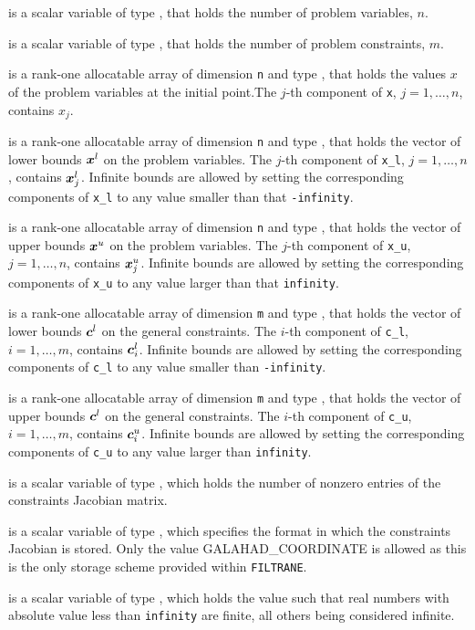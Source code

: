 \documentclass{galahad}
\newcommand{\packagename}{FILTRANE}
\newcommand{\sym}{\sf\small}
\newcommand{\filtrane}{{\tt \packagename}}
\begin{document}
\begin{description}
 is a scalar variable of type \integer, 
 that holds the number of problem variables, $n$.  

 is a scalar variable of type \integer, 
 that holds the number of problem constraints, $m$.

 is a rank-one allocatable array of dimension {\tt n} and type 
\realdp, that holds the values $x$ of the problem variables at the
initial point.The $j$-th component of {\tt x}, $j = 1,  \ldots , n$, contains
$x_{j}$.

 is a rank-one allocatable array of dimension {\tt n} and type 
\realdp, that holds
the vector of lower bounds ${\bm{x}}^l$ on the problem variables.
The $j$-th component of {\tt x\_l}, $j = 1, \ldots , n$, 
contains ${\bm{x}}^l_{j}$.
Infinite bounds are allowed by setting the corresponding 
components of {\tt x\_l} to any value smaller than that {\tt -infinity}.

 is a rank-one allocatable array of dimension {\tt n} and type 
\realdp, that holds
the vector of upper bounds ${\bm{x}}^u$ on the problem variables.
The $j$-th component of {\tt x\_u}, $j = 1, \ldots , n$, 
contains ${\bm{x}}^u_{j}$.
Infinite bounds are allowed by setting the corresponding 
components of {\tt x\_u} to any value larger than that {\tt infinity}.

 is a rank-one allocatable array of dimension {\tt m} and type 
\realdp, that holds the vector of lower bounds ${\bm{c}}^{l}$ 
on the general constraints. The $i$-th component of 
{\tt c\_l}, $i = 1, \ldots , m$, contains ${\bm{c}}_{i}^{l}$.
Infinite bounds are allowed by setting the corresponding 
components of {\tt c\_l} to any value smaller than {\tt -infinity}. 

 is a rank-one allocatable array of dimension {\tt m} and type 
\realdp, that holds the vector of upper bounds ${\bm{c}}^{l}$ 
on the general constraints. The $i$-th component of 
{\tt c\_u}, $i = 1, \ldots , m$, contains ${\bm{c}}_{i}^{u}$.
Infinite bounds are allowed by setting the corresponding 
components of {\tt c\_u} to any value larger than {\tt infinity}. 

 is a scalar variable of type \integer, 
which holds the number of nonzero entries of the constraints Jacobian matrix.

 is a scalar variable of type \integer, 
which specifies the format in which the constraints Jacobian is stored.
Only the value {\sym GALAHAD\_COORDINATE} is allowed as this is the only
storage scheme provided within \filtrane.

 is a scalar variable of type \realdp, which
holds the value such that real numbers with absolute value less than
{\tt infinity} are finite, all others being considered infinite.
\end{description}
\end{document}
